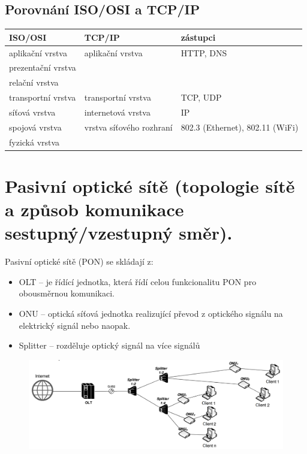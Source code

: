 \subsection{Porovnání ISO/OSI a TCP/IP}

\begin{table}[ht]
    \centering
    \begin{tabular}{lll}
    \textbf{ISO/OSI} & \textbf{TCP/IP} & zástupci \\
    \hline \hline
    aplikační vrstva   & aplikační vrstva   & HTTP, DNS \\
    prezentační vrstva &                    & \\
    relační vrstva     &                    & \\
    \hline
    transportní vrstva & transportní vrstva & TCP, UDP \\
    \hline
    síťová vrstva      & internetová vrstva & IP \\
    \hline
    spojová vrstva     & vrstva síťového rozhraní & 802.3 (Ethernet), 802.11 (WiFi) \\
    fyzická vrstva     &                    & \\
    \end{tabular}
    \label{Srovnání modelů ISO/OSI a TCP/IP}
\end{table}


\clearpage
\section{Pasivní optické sítě (topologie sítě a způsob komunikace sestupný/vzestupný směr).}
Pasivní optické sítě (PON) se skládají z:
\begin{itemize}
    \item OLT -- je řídící jednotka, která řídí celou funkcionalitu PON pro obousměrnou komunikaci.
    \item ONU -- optická síťová jednotka realizující převod z optického signálu na elektrický signál nebo naopak.
    \item Splitter -- rozděluje optický signál na více signálů
\end{itemize}
\begin{figure} [h]
    \centering
    \includegraphics[width=\textwidth]{snimky/PONTopologie.png}
    \label{fig:pon}
\end{figure}


